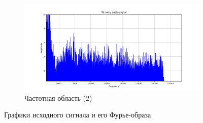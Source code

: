 \documentclass[a4paper, 12pt]{article}
\begin{document}
\begin{figure}[H]
\begin{subfigure}{0.45\textwidth}
            \centering
            \includegraphics[width=\linewidth]{U_audio_2.png}
            \caption{Частотная область (2)}
            \label{fig:fig1122}
        \end{subfigure}
        \caption{Графики исходного сигнала и его Фурье-образа}
        \label{fig:timefreq0}
    \end{figure}
    
\end{document}
